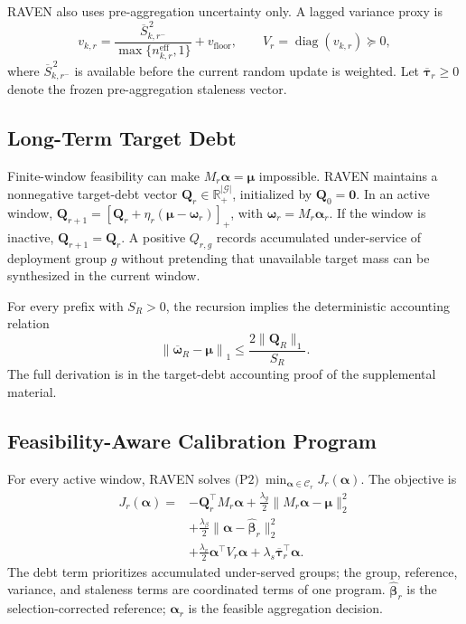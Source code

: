 \documentclass[letterpaper,journal]{IEEEtran}
\begin{document}
RAVEN also uses pre-aggregation uncertainty only.  A lagged variance proxy is
\begin{equation}
 v_{k,r}
 =
 \frac{
 \overline S_{k,r^-}^{\,2}
 }{
 \max\{n^{\mathrm{eff}}_{k,r},1\}
 }
 +
 v_{\mathrm{floor}},
 \qquad
 V_r=\operatorname{diag}(v_{k,r})\succeq0,
 \label{eq:variance_proxy}
\end{equation}
where $\overline S_{k,r^-}^{\,2}$ is available before the current random update
is weighted.  Let $\overline{\boldsymbol\tau}_r\ge0$ denote the frozen
pre-aggregation staleness vector.

\subsection{Long-Term Target Debt}
\label{subsec:debt}

Finite-window feasibility can make
$M_r\boldsymbol\alpha=\boldsymbol\mu$ impossible.  RAVEN maintains a
nonnegative target-debt vector
$\mathbf{Q}_r\in\mathbb{R}^{|\mathcal{G}|}_+$, initialized by
$\mathbf{Q}_0=\mathbf{0}$.  In an active window,
$\mathbf{Q}_{r+1}=\left[\mathbf{Q}_r+\eta_r(\boldsymbol\mu-\boldsymbol\omega_r)\right]_+$,
with $\boldsymbol\omega_r=M_r\boldsymbol\alpha_r$.
If the window is inactive, $\mathbf{Q}_{r+1}=\mathbf{Q}_r$.  A positive
$Q_{r,g}$ records accumulated under-service of deployment group $g$ without
pretending that unavailable target mass can be synthesized in the current
window.

For every prefix with $S_R>0$, the recursion implies the deterministic
accounting relation
\begin{equation}
 \left\|
 \overline{\boldsymbol\omega}_R-\boldsymbol\mu
 \right\|_1
 \le
 \frac{
 2\|\mathbf{Q}_R\|_1
 }{S_R}.
 \label{eq:debt_bound}
\end{equation}
The full derivation is in the target-debt accounting proof of the supplemental material.

\subsection{Feasibility-Aware Calibration Program}
\label{subsec:P2}

For every active window, RAVEN solves
$\text{(P2)}\ \min_{\boldsymbol\alpha\in\mathcal{C}_r}J_r(\boldsymbol\alpha)$.
The objective is
\begin{align}
 J_r(\boldsymbol\alpha)
 ={}&-\mathbf{Q}_r^{\top}M_r\boldsymbol\alpha
 +\frac{\lambda_g}{2}
 \|M_r\boldsymbol\alpha-\boldsymbol\mu\|_2^2
 \nonumber\\
 &+\frac{\lambda_{\beta}}{2}
 \|\boldsymbol\alpha-\widehat{\boldsymbol\beta}_r\|_2^2
 \nonumber\\
 &+\frac{\lambda_v}{2}
 \boldsymbol\alpha^{\top}V_r\boldsymbol\alpha
 +\lambda_s\overline{\boldsymbol\tau}_r^{\top}\boldsymbol\alpha.
\label{eq:P2_objective}
\end{align}
The debt term prioritizes accumulated under-served groups; the group,
reference, variance, and staleness terms are coordinated terms of one
program.  $\widehat{\boldsymbol\beta}_r$ is the selection-corrected
reference; $\boldsymbol\alpha_r$ is the feasible aggregation decision.
\end{document}
